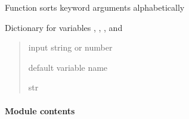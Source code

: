 \documentclass[letterpaper,10pt,english]{sphinxmanual}
\begin{document}
\begin{fulllineitems}
\label{\detokenize{diffsph.utils:diffsph.utils.tools.sort_kwargs}}
\pysigstartsignatures
{}
\pysigstopsignatures
\sphinxAtStartPar
Function sorts keyword arguments alphabetically

\end{fulllineitems}


\begin{fulllineitems}
\label{\detokenize{diffsph.utils:diffsph.utils.tools.var_to_str}}
\pysigstartsignatures
{}
\pysigstopsignatures
\sphinxAtStartPar
Dictionary for variables , , ,  and 
\begin{quote}\begin{description}
\sphinxAtStartPar
{} \textendash{} input string or number

\sphinxAtStartPar
default variable name

\sphinxAtStartPar
str

\end{description}\end{quote}

\end{fulllineitems}



\paragraph{Module contents}
\label{\detokenize{diffsph.utils:module-diffsph.utils}}\label{\detokenize{diffsph.utils:module-contents}}
\end{document}
